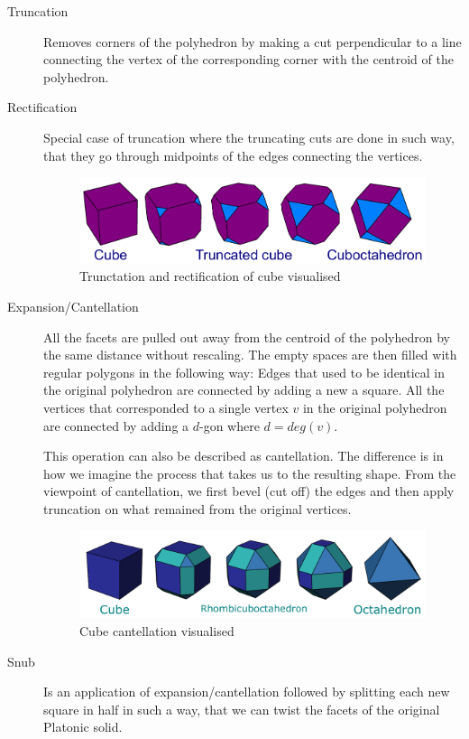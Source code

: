 \begin{description}
    \item[Truncation] Removes corners of the polyhedron by making a cut perpendicular to a line connecting the vertex of the corresponding corner with the centroid of the polyhedron.
    \item[Rectification] Special case of truncation where the truncating cuts are done in such way, that they go through midpoints of the edges connecting the vertices. 
    \begin{figure}[H]
        \centering
        \includegraphics[width=1\textwidth]{../Resources/Figs/op_truncation.pdf}
        \caption{Trunctation and rectification of cube visualised \cite{wikimedia-cube-truncation}}
        \label{fig:op_truncation}
    \end{figure}
    \item[Expansion/Cantellation] All the facets are pulled out away from the centroid of the polyhedron by the same distance without rescaling. The empty spaces are then filled with regular polygons in the following way: Edges that used to be identical in the original polyhedron are connected by adding a new a square. All the vertices that corresponded to a single vertex $v$ in the original polyhedron are connected by adding a $d$-gon where $d=deg(v)$.

    This operation can also be described as cantellation. The difference is in how we imagine the process that takes us to the resulting shape. From the viewpoint of cantellation, we first bevel (cut off) the edges and then apply truncation on what remained from the original vertices.
    \begin{figure}[H]
        \centering
        \includegraphics[width=1\textwidth]{../Resources/Figs/op_cantellation.pdf}
        \caption{Cube cantellation visualised \cite{wikimedia-cube-cantellation}}
        \label{fig:op_cantellation}
    \end{figure}
    \item[Snub] Is an application of expansion/cantellation followed by splitting each new square in half in such a way, that we can twist the facets of the original Platonic solid.
    


\end{description}
